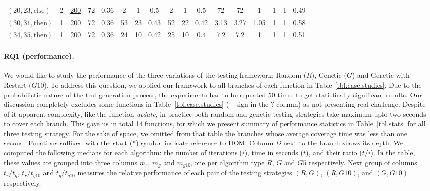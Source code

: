 \documentclass[sigconf]{acmart}
\newcommand{\thenBr}{\text{then}}
\newcommand{\elseBr}{\text{else}}
\newcommand{\un}[1]{\underline{#1}}
\begin{document}
\begin{table}[!t]
\begin{tabular}{lc|ccc|ccc|ccc|ccc|ccc}
    $(20,23,\elseBr)$ & 2        & \un{200} & 72   & 0.36      & 2   & 1    & 0.5           & 2   & 1   & 0.5              & 72     & 72    & 1      & 1 & 1 &  0.49  \\
    $(30,31,\thenBr)$ & 1        & \un{200} & 72   & 0.36      & 53  & 23   & 0.43          & 52  & 22  & 0.42             & 3.13   & 3.27  & 1.05   & 1 & 1 &  0.58  \\
    $(34,35,\thenBr)$ & 1        & \un{200} & 72   & 0.36      & 24  & 10   & 0.42          & 25  & 10  & 0.4              & 7.2    & 7.2   & 1      & 1 & 1 &  0.51  \\
    \bottomrule
    \end{tabular}
\end{table}

\paragraph{\textbf{RQ1 (performance).}} We would like to study the performance of the three variations of the testing framework: Random ($R$), Genetic ($G$) and Genetic with Restart ($G10$). To address this question, we applied our framework to all branches of each function in Table~\ref{tbl.case.studies}. Due to the probabilistic nature of the test generation process, the experiments has to be repeated 50 times to get statistically significant results. Our discussion completely excludes some functions in Table~\ref{tbl.case.studies} ($-$ sign in the $?$ column) as not presenting real challenge. Despite of it apparent complexity, like the function \emph{update}, in practice both random and genetic testing strategies take maximum upto two seconds to cover each branch. This gave us in total 14 functions, for which we present summary of performance statistics in Table~\ref{tbl.stats} for all three testing strategy. For the sake of space, we omitted from that table the branches whose average coverage time was less than one second. Functions suffixed with the start (*) symbol indicate reference to DOM.  Column $D$ next to the branch shows its depth. We computed the following medians for each algorithm: the number of iterations ($i$), time in seconds ($t$), and their ratio ($t/i$). In the table, these values are grouped into three columns $m_r$, $m_g$ and $m_{g10}$, one per algorithm type $R$, $G$ and $G5$  respectively. Next group of columns $t_r/t_g$, $t_r/t_{g10}$ and $t_g/t_{g10}$ measures the relative performance of each pair of the testing strategies $(R,G)$, $(R,G10)$, and $(G,G10)$ respectively.
\end{document}
